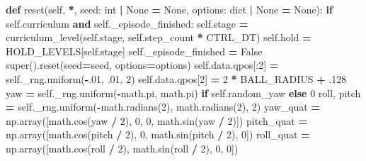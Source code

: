 \documentclass[
  american,
  11pt,
  letterpaper,
]{article}
\newenvironment{Shaded}{\begin{snugshade}}{\end{snugshade}}
\newcommand{\BuiltInTok}[1]{#1}
\newcommand{\ControlFlowTok}[1]{\textcolor[rgb]{0.13,0.29,0.53}{\textbf{#1}}}
\newcommand{\DecValTok}[1]{\textcolor[rgb]{0.00,0.00,0.81}{#1}}
\newcommand{\FloatTok}[1]{\textcolor[rgb]{0.00,0.00,0.81}{#1}}
\newcommand{\KeywordTok}[1]{\textcolor[rgb]{0.13,0.29,0.53}{\textbf{#1}}}
\newcommand{\NormalTok}[1]{#1}
\newcommand{\OperatorTok}[1]{\textcolor[rgb]{0.81,0.36,0.00}{\textbf{#1}}}
\newcommand{\VariableTok}[1]{\textcolor[rgb]{0.00,0.00,0.00}{#1}}
\renewenvironment{Shaded}{\par\smallskip}{\par\smallskip}
\begin{document}
\begin{Shaded}
\begin{Highlighting}[]
    \KeywordTok{def}\NormalTok{ reset(}\VariableTok{self}\NormalTok{, }\OperatorTok{*}\NormalTok{, seed: }\BuiltInTok{int} \OperatorTok{|} \VariableTok{None} \OperatorTok{=} \VariableTok{None}\NormalTok{, options: }\BuiltInTok{dict} \OperatorTok{|} \VariableTok{None} \OperatorTok{=} \VariableTok{None}\NormalTok{):}
        \ControlFlowTok{if} \VariableTok{self}\NormalTok{.curriculum }\KeywordTok{and} \VariableTok{self}\NormalTok{.\_episode\_finished:}
            \VariableTok{self}\NormalTok{.stage }\OperatorTok{=}\NormalTok{ curriculum\_level(}\VariableTok{self}\NormalTok{.stage, }\VariableTok{self}\NormalTok{.step\_count }\OperatorTok{*}\NormalTok{ CTRL\_DT)}
            \VariableTok{self}\NormalTok{.hold }\OperatorTok{=}\NormalTok{ HOLD\_LEVELS[}\VariableTok{self}\NormalTok{.stage]}
        \VariableTok{self}\NormalTok{.\_episode\_finished }\OperatorTok{=} \VariableTok{False}
        \BuiltInTok{super}\NormalTok{().reset(seed}\OperatorTok{=}\NormalTok{seed, options}\OperatorTok{=}\NormalTok{options)}
        \VariableTok{self}\NormalTok{.data.qpos[:}\DecValTok{2}\NormalTok{] }\OperatorTok{=} \VariableTok{self}\NormalTok{.\_rng.uniform(}\OperatorTok{{-}}\FloatTok{.01}\NormalTok{, }\FloatTok{.01}\NormalTok{, }\DecValTok{2}\NormalTok{)}
        \VariableTok{self}\NormalTok{.data.qpos[}\DecValTok{2}\NormalTok{] }\OperatorTok{=} \DecValTok{2} \OperatorTok{*}\NormalTok{ BALL\_RADIUS }\OperatorTok{+} \FloatTok{.128}
\NormalTok{        yaw }\OperatorTok{=} \VariableTok{self}\NormalTok{.\_rng.uniform(}\OperatorTok{{-}}\NormalTok{math.pi, math.pi) }\ControlFlowTok{if} \VariableTok{self}\NormalTok{.random\_yaw }\ControlFlowTok{else} \DecValTok{0}
\NormalTok{        roll, pitch }\OperatorTok{=} \VariableTok{self}\NormalTok{.\_rng.uniform(}\OperatorTok{{-}}\NormalTok{math.radians(}\DecValTok{2}\NormalTok{), math.radians(}\DecValTok{2}\NormalTok{), }\DecValTok{2}\NormalTok{)}
\NormalTok{        yaw\_quat }\OperatorTok{=}\NormalTok{ np.array([math.cos(yaw }\OperatorTok{/} \DecValTok{2}\NormalTok{), }\DecValTok{0}\NormalTok{, }\DecValTok{0}\NormalTok{, math.sin(yaw }\OperatorTok{/} \DecValTok{2}\NormalTok{)])}
\NormalTok{        pitch\_quat }\OperatorTok{=}\NormalTok{ np.array([math.cos(pitch }\OperatorTok{/} \DecValTok{2}\NormalTok{), }\DecValTok{0}\NormalTok{, math.sin(pitch }\OperatorTok{/} \DecValTok{2}\NormalTok{), }\DecValTok{0}\NormalTok{])}
\NormalTok{        roll\_quat }\OperatorTok{=}\NormalTok{ np.array([math.cos(roll }\OperatorTok{/} \DecValTok{2}\NormalTok{), math.sin(roll }\OperatorTok{/} \DecValTok{2}\NormalTok{), }\DecValTok{0}\NormalTok{, }\DecValTok{0}\NormalTok{])}

\end{Highlighting}
\end{Shaded}
\end{document}
